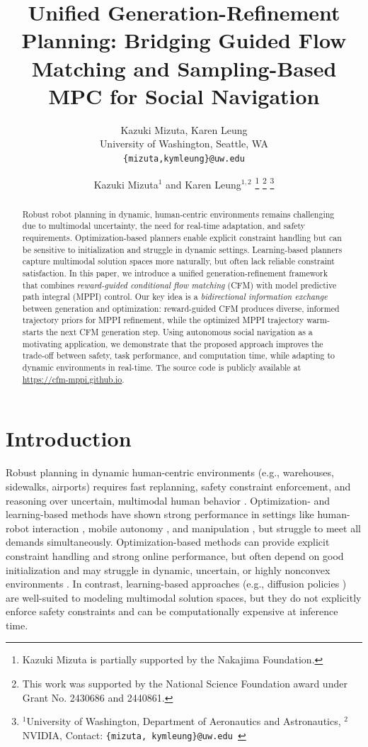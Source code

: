 \documentclass[letterpaper,10 pt,conference]{ieeeconf}
\title{\LARGE \bf
Unified Generation-Refinement Planning: Bridging Guided Flow Matching and Sampling-Based MPC for Social Navigation
}
\author{
  Kazuki Mizuta, Karen Leung\\
  University of Washington, Seattle, WA\\
  \texttt{\{mizuta,kymleung\}@uw.edu} \\
}
\author{Kazuki Mizuta$^{1}$ and Karen Leung$^{1,2}$
\thanks{Kazuki Mizuta is partially supported by the Nakajima Foundation.}
\thanks{This work was supported by the National Science Foundation award under Grant No. 2430686 and 2440861.}
\thanks{$^1$University of Washington, Department of Aeronautics and Astronautics, $^2$ NVIDIA,
        Contact: {\tt\small \{mizuta, kymleung\}@uw.edu }}
}
\begin{document}
\maketitle
\thispagestyle{empty}
\pagestyle{empty}


\begin{abstract}
    Robust robot planning in dynamic, human-centric environments remains challenging due to multimodal uncertainty, the need for real-time adaptation, and safety requirements. Optimization-based planners enable explicit constraint handling but can be sensitive to initialization and struggle in dynamic settings. Learning-based planners capture multimodal solution spaces more naturally, but often lack reliable constraint satisfaction. In this paper, we introduce a unified generation-refinement framework that combines \textit{reward-guided conditional flow matching} (CFM) with model predictive path integral (MPPI) control. Our key idea is a \textit{bidirectional information exchange} between generation and optimization: reward-guided CFM produces diverse, informed trajectory priors for MPPI refinement, while the optimized MPPI trajectory warm-starts the next CFM generation step. Using autonomous social navigation as a motivating application, we demonstrate that the proposed approach improves the trade-off between safety, task performance, and computation time, while adapting to dynamic environments in real-time. The source code is publicly available at \url{https://cfm-mppi.github.io}.
\end{abstract}

\section{Introduction} \label{sec:introduction}

Robust planning in dynamic human-centric environments (e.g., warehouses, sidewalks, airports) requires fast replanning, safety constraint enforcement, and reasoning over uncertain, multimodal human behavior \cite{RudenkoPalmieriEtAl2020,LeungSchmerlingEtAl2020,SchmerlingLeungEtAl2018,NishimuraIvanovicEtAl2020}. 
Optimization- and learning-based methods have shown strong performance in settings like human-robot interaction \cite{NishimuraIvanovicEtAl2020,EverettChenEtAl2018}, mobile autonomy \cite{WilliamsDrewsEtAl2016,ScharfAcikmeseEtAl2017}, and manipulation \cite{ChiFengEtAl2023}, but struggle to meet all demands simultaneously.
Optimization-based methods \cite{AcikmeseBlackmore2011} can provide explicit constraint handling and strong online performance, but often depend on good initialization and may struggle in dynamic, uncertain, or highly nonconvex environments \cite{GrootBritoEtAl2021}.
In contrast, learning-based approaches (e.g., diffusion policies \cite{SohlDicksteinWeissEtAl2015,HoJainEtAl2020,JannerDuEtAl2022}) are well-suited to modeling multimodal solution spaces, but they do not explicitly enforce safety constraints and can be computationally expensive at inference time.
\end{document}
